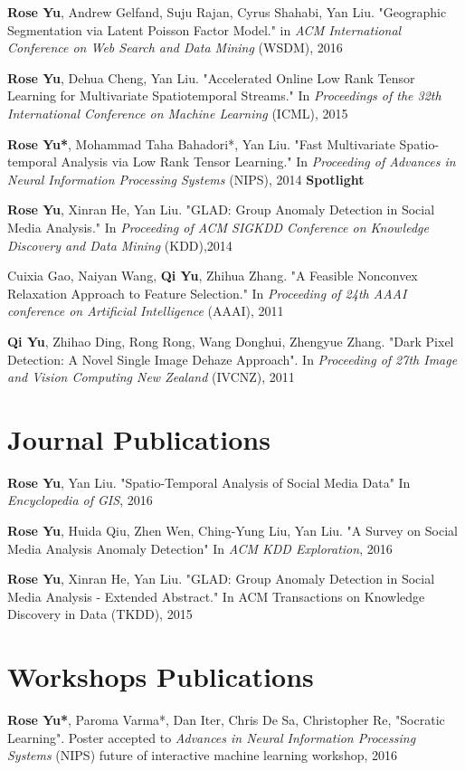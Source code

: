 \documentclass[margin,line]{res}
\begin{document}
\begin{resume}
{\bf Rose Yu}, Andrew Gelfand, Suju Rajan, Cyrus Shahabi, Yan Liu. "Geographic Segmentation via Latent Poisson Factor Model." in \textit{ACM International Conference on Web Search and Data Mining} (WSDM), 2016 

{\bf Rose Yu}, Dehua Cheng, Yan Liu. "Accelerated Online Low Rank Tensor Learning for Multivariate Spatiotemporal Streams." In \textit{Proceedings  of the 32th International Conference on Machine Learning} (ICML), 2015

{\bf Rose Yu*}, Mohammad Taha Bahadori*, Yan Liu. "Fast Multivariate Spatio-temporal Analysis via Low Rank Tensor Learning." In \textit{Proceeding of Advances in Neural Information Processing Systems} (NIPS), 2014 \textbf{Spotlight}

{\bf Rose Yu}, Xinran He, Yan Liu. "GLAD: Group Anomaly Detection in Social Media Analysis." In \textit{Proceeding of ACM SIGKDD Conference on Knowledge Discovery and Data Mining} (KDD),2014

Cuixia Gao, Naiyan Wang, {\bf Qi Yu}, Zhihua Zhang. "A Feasible Nonconvex Relaxation Approach to Feature Selection." In \textit{Proceeding of 24th AAAI conference on Artificial Intelligence} (AAAI), 2011 

{\bf Qi Yu}, Zhihao Ding, Rong Rong, Wang Donghui, Zhengyue Zhang. "Dark Pixel Detection: A Novel Single Image Dehaze Approach". In \textit{Proceeding of 27th Image and Vision Computing New Zealand }(IVCNZ), 2011  

 
\section{\sc Journal Publications}
{\bf Rose Yu},  Yan Liu.  "Spatio-Temporal Analysis of Social Media Data"  In \textit{Encyclopedia of GIS}, 2016

{\bf Rose Yu}, Huida Qiu, Zhen Wen, Ching-Yung Liu,  Yan Liu. "A Survey on Social Media Analysis  Anomaly Detection" In \textit{ACM KDD Exploration},  2016

{\bf Rose Yu}, Xinran He, Yan Liu. "GLAD: Group Anomaly Detection in Social Media Analysis - Extended Abstract." In \textit{}ACM Transactions on Knowledge Discovery in Data  (TKDD), 2015


\section{\sc Workshops Publications}


{\bf Rose Yu*},  Paroma Varma*, Dan Iter, Chris De Sa, Christopher Re,  "Socratic Learning".  Poster accepted to \textit{Advances in Neural Information Processing Systems}  (NIPS) future of interactive machine learning workshop, 2016



\end{resume}
\end{document}
